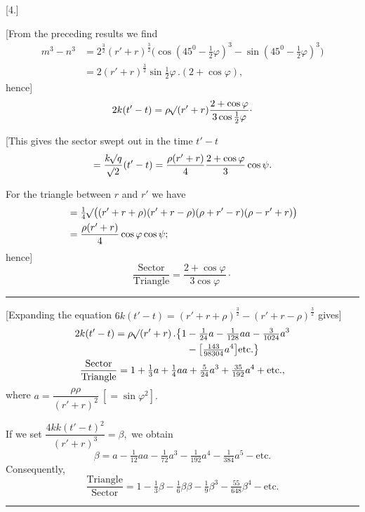 \clearpage
{}
\begin{center}
[4.]\par
{}
\end{center}

[From the preceding results we find
\[
\begin{aligned}
m^3-n^3&=2^{\frac32}(r'+r)^{\frac32}\bigl(\cos(45^0-\tfrac12\varphi)^3-\sin(45^0-\tfrac12\varphi)^3\bigr)\\
&=2(r'+r)^{\frac32}\sin\tfrac12\varphi\,.(2+\cos\varphi),
\end{aligned}
\]
hence]
\[
2k(t'-t)=\rho\mathord{{}^{}\!\surd}(r'+r)\frac{2+\cos\varphi}{3\cos\tfrac12\varphi}\mathpunct{\cdot}
\]

[This gives the sector swept out in the time \(t'-t\)
\[
=\frac{k\mathord{{}^{}\!\surd}q}{\mathord{{}^{}\!\surd}2}(t'-t)=\frac{\rho(r'+r)}4\frac{2+\cos\varphi}3\cos\psi.
\]

For the triangle between \(r\) and \(r'\) we have
\[
\begin{aligned}
&=\tfrac14\mathord{{}^{}\!\surd}\bigl((r'+r+\rho)(r'+r-\rho)(\rho+r'-r)(\rho-r'+r)\bigr)\\
&=\frac{\rho(r'+r)}4\cos\varphi\cos\psi;
\end{aligned}
\]
hence]
\[
\frac{\mathrm{Sector}}{\mathrm{Triangle}}=\frac{2+\cos\varphi}{3\cos\varphi}\mathpunct{\cdot}
\]
\begin{center}\rule{.3\linewidth}{.4pt}\end{center}

[Expanding the equation \(6k(t'-t)=(r'+r+\rho)^{\frac32}-(r'+r-\rho)^{\frac32}\) gives]
\[
\begin{gathered}
\begin{aligned}
2k(t'-t)=\rho\mathord{{}^{}\!\surd}(r'+r)\,.\bigl\{1&-\tfrac1{24}a-\tfrac1{128}aa-\tfrac3{1024}a^3\\
&-\bigl[\tfrac{143}{98304}a^4\bigr]\mathrm{etc.}\bigr\}
\end{aligned}\\
\frac{\mathrm{Sector}}{\mathrm{Triangle}}=1+\tfrac13a+\tfrac14aa+\tfrac5{24}a^3+\tfrac{35}{192}a^4+\mathrm{etc.},
\end{gathered}
\]
where \(a=\dfrac{\rho\rho}{(r'+r)^2}\ [=\sin\varphi^2].\)

If we set \(\dfrac{4kk(t'-t)^2}{(r'+r)^3}=\beta,\) we obtain
\[
\beta=a-\tfrac1{12}aa-\tfrac1{72}a^3-\tfrac1{192}a^4-\tfrac1{384}a^5-\mathrm{etc.}
\]
Consequently,
\[
\frac{\mathrm{Triangle}}{\mathrm{Sector}}=1-\tfrac13\beta-\tfrac16\beta\beta-\tfrac19\beta^3-\tfrac{55}{648}\beta^4-\mathrm{etc.}
\]
\begin{center}\rule{.3\linewidth}{.4pt}\end{center}

